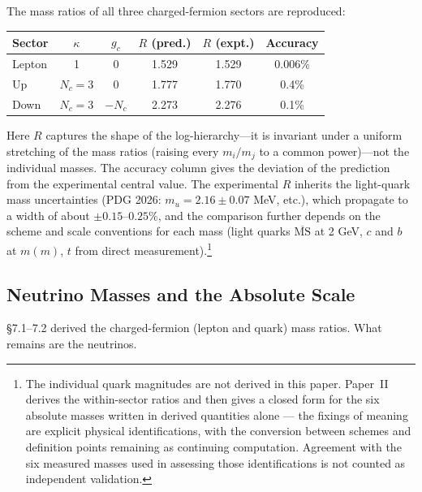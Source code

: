 \documentclass[12pt,a4paper]{article}
\begin{document}
The mass ratios of all three charged-fermion sectors are reproduced:

\begin{center}\small
\begin{tabular}{lccccc}
\toprule
Sector & $\kappa$ & $g_c$ & $R$ (pred.) & $R$ (expt.) & Accuracy \\
\midrule
Lepton  & 1 & 0 & 1.529 & 1.529 & 0.006\% \\
Up      & $N_c = 3$ & 0 & 1.777 & 1.770 & 0.4\% \\
Down    & $N_c = 3$ & $-N_c$ & 2.273 & 2.276 & 0.1\% \\
\bottomrule
\end{tabular}
\end{center}

\noindent Here $R$ captures the shape of the log-hierarchy---it is invariant under a uniform stretching of the mass ratios (raising every $m_i/m_j$ to a common power)---not the individual masses. The accuracy column gives the deviation of the prediction from the experimental central value. The experimental $R$ inherits the light-quark mass uncertainties (PDG 2026: $m_u = 2.16 \pm 0.07$ MeV, etc.), which propagate to a width of about $\pm0.15$--$0.25\%$, and the comparison further depends on the scheme and scale conventions for each mass (light quarks $\overline{\mathrm{MS}}$ at 2 GeV, $c$ and $b$ at $m(m)$, $t$ from direct measurement).\footnote{The individual quark magnitudes are not derived in this paper. Paper~II derives the within-sector ratios and then gives a closed form for the six absolute masses written in derived quantities alone — the fixings of meaning are explicit physical identifications, with the conversion between schemes and definition points remaining as continuing computation. Agreement with the six measured masses used in assessing those identifications is not counted as independent validation.}

\subsection{Neutrino Masses and the Absolute Scale}

\S7.1--7.2 derived the charged-fermion (lepton and quark) mass ratios. What remains are the neutrinos.
\end{document}
